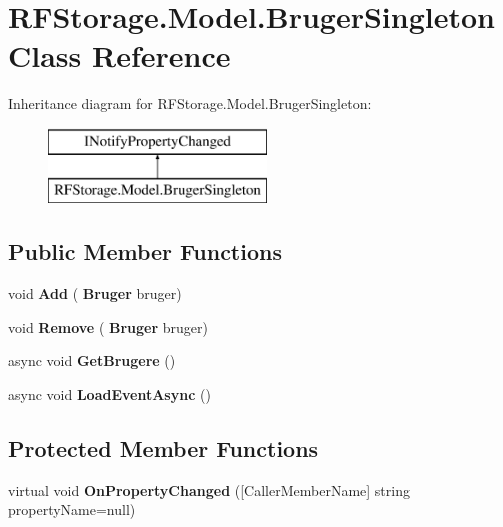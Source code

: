 \section{R\+F\+Storage.\+Model.\+Bruger\+Singleton Class Reference}
\label{class_r_f_storage_1_1_model_1_1_bruger_singleton}
Inheritance diagram for R\+F\+Storage.\+Model.\+Bruger\+Singleton\+:\begin{figure}[H]
\begin{center}
\leavevmode
\includegraphics[height=2.000000cm]{class_r_f_storage_1_1_model_1_1_bruger_singleton}
\end{center}
\end{figure}
\subsection*{Public Member Functions}
\begin{DoxyCompactItemize}
\item 
\mbox{\label{class_r_f_storage_1_1_model_1_1_bruger_singleton_a6919d6db3b0ad3b93df0a8c3e61e9315}} 
void {\bfseries Add} (\textbf{ Bruger} bruger)
\item 
\mbox{\label{class_r_f_storage_1_1_model_1_1_bruger_singleton_a60eeb8fa970635bc1dbbc07823f29914}} 
void {\bfseries Remove} (\textbf{ Bruger} bruger)
\item 
\mbox{\label{class_r_f_storage_1_1_model_1_1_bruger_singleton_a5d50e247b81a3b89512085c0200877bb}} 
async void {\bfseries Get\+Brugere} ()
\item 
\mbox{\label{class_r_f_storage_1_1_model_1_1_bruger_singleton_ab03d9deda0023db41504e9c34166bd1e}} 
async void {\bfseries Load\+Event\+Async} ()
\end{DoxyCompactItemize}
\subsection*{Protected Member Functions}
\begin{DoxyCompactItemize}
\item 
\mbox{\label{class_r_f_storage_1_1_model_1_1_bruger_singleton_aedb74f78f190a4bf0156a9083a5e3b4a}} 
virtual void {\bfseries On\+Property\+Changed} ([Caller\+Member\+Name] string property\+Name=null)
\end{DoxyCompactItemize}
